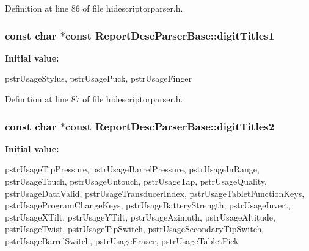 \-Definition at line 86 of file hidescriptorparser.\-h.

\hypertarget{class_report_desc_parser_base_abc5202f47578494d3f6008413f632873}{
\subsubsection[{digit\-Titles1}]{\setlength{\rightskip}{0pt plus 5cm}const char $\ast$const {\bf \-Report\-Desc\-Parser\-Base\-::digit\-Titles1}}}\label{class_report_desc_parser_base_abc5202f47578494d3f6008413f632873}
{\bfseries \-Initial value\-:}
\begin{DoxyCode}
 {
        pstrUsageStylus,
        pstrUsagePuck,
        pstrUsageFinger

}
\end{DoxyCode}


\-Definition at line 87 of file hidescriptorparser.\-h.

\hypertarget{class_report_desc_parser_base_addaa9b5724f7d1ca10ba4ca14decd40d}{
\subsubsection[{digit\-Titles2}]{\setlength{\rightskip}{0pt plus 5cm}const char $\ast$const {\bf \-Report\-Desc\-Parser\-Base\-::digit\-Titles2}}}\label{class_report_desc_parser_base_addaa9b5724f7d1ca10ba4ca14decd40d}
{\bfseries \-Initial value\-:}
\begin{DoxyCode}
 {
        pstrUsageTipPressure,
        pstrUsageBarrelPressure,
        pstrUsageInRange,
        pstrUsageTouch,
        pstrUsageUntouch,
        pstrUsageTap,
        pstrUsageQuality,
        pstrUsageDataValid,
        pstrUsageTransducerIndex,
        pstrUsageTabletFunctionKeys,
        pstrUsageProgramChangeKeys,
        pstrUsageBatteryStrength,
        pstrUsageInvert,
        pstrUsageXTilt,
        pstrUsageYTilt,
        pstrUsageAzimuth,
        pstrUsageAltitude,
        pstrUsageTwist,
        pstrUsageTipSwitch,
        pstrUsageSecondaryTipSwitch,
        pstrUsageBarrelSwitch,
        pstrUsageEraser,
        pstrUsageTabletPick
}
\end{DoxyCode}


